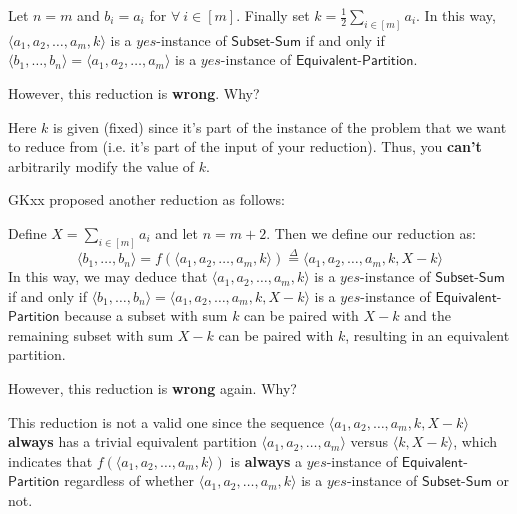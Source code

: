 \begin{parts}
\begin{subparts}
        Let $n = m$ and $b_i = a_i$ for $\forall \: i \in [m]$. Finally set $k = \frac{1}{2} \sum_{i\in [m]} a_i$. In this way, $ \langle{a_1, a_2, \ldots, a_m, k\rangle}$ is a $yes$-instance of $\mathsf{Subset \text{-} Sum}$ if and only if $\langle{b_1, \ldots, b_{n}\rangle} = \langle{a_1, a_2, \ldots, a_m\rangle}$ is a $yes$-instance of $\mathsf{Equivalent \text{-} Partition}$.

        However, this reduction is \textbf{wrong}. Why?
        \begin{solution}

            Here $k$ is given (fixed) since it's part of the instance of the problem that we want to reduce from (i.e. it's part of the input of your reduction). Thus, you \textbf{can't} arbitrarily modify the value of $k$.
        \end{solution}

        \newpage

        \subpart [0] GKxx proposed another reduction as follows:

        Define $X = \sum_{i\in [m]} a_i$ and let $n = m +2$. Then we define our reduction as:
        $$\langle{b_1, \ldots, b_{n}\rangle} = f(\langle{a_1, a_2, \ldots, a_m, k\rangle}) \overset{\Delta}{=} \langle{a_1, a_2, \ldots, a_m, k, X - k\rangle}$$
        In this way, we may deduce that $\langle{a_1, a_2, \ldots, a_m, k\rangle}$ is a $yes$-instance of $\mathsf{Subset \text{-} Sum}$ if and only if $\langle{b_1, \ldots, b_{n}\rangle} = \langle{a_1, a_2, \ldots, a_m, k, X - k\rangle}$ is a $yes$-instance of $\mathsf{Equivalent}$-$\mathsf{Partition}$ because a subset with sum $k$ can be paired with $X - k$ and the remaining subset with sum $X - k$ can be paired with $k$, resulting in an equivalent partition.

        However, this reduction is \textbf{wrong} again. Why?
        \begin{solution}

            This reduction is not a valid one since the sequence $\langle{a_1, a_2, \ldots, a_m, k, X - k\rangle}$ \textbf{always} has a trivial equivalent partition $\langle{a_1, a_2, \ldots, a_m\rangle}$ versus $\langle{k, X - k\rangle}$, which indicates that $f(\langle{a_1, a_2, \ldots, a_m, k\rangle})$ is \textbf{always} a $yes$-instance of $\mathsf{Equivalent}$-$\mathsf{Partition}$ regardless of whether $\langle{a_1, a_2, \ldots, a_m, k\rangle}$ is a $yes$-instance of $\mathsf{Subset \text{-} Sum}$ or not.
        \end{solution}


\end{subparts}
\end{parts}
